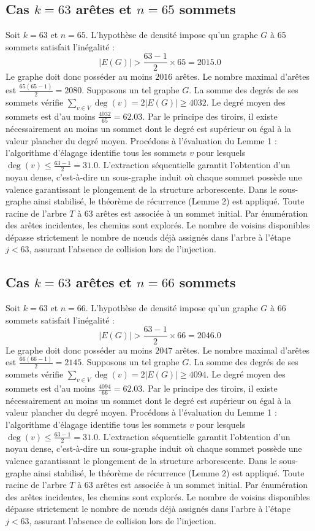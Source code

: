 \documentclass[12pt,a4paper]{article}
\begin{document}
\subsection{Cas $k = 63$ arêtes et $n = 65$ sommets}
Soit $k = 63$ et $n = 65$. L'hypothèse de densité impose qu'un graphe $G$ à 65 sommets satisfait l'inégalité :
$$ |E(G)| > \frac{63-1}{2} \times 65 = 2015.0 $$
Le graphe doit donc posséder au moins $2016$ arêtes. Le nombre maximal d'arêtes est $\frac{65(65-1)}{2} = 2080$.
Supposons un tel graphe $G$. La somme des degrés de ses sommets vérifie $\sum_{v \in V} \deg(v) = 2|E(G)| \geq 4032$.
Le degré moyen des sommets est d'au moins $\frac{4032}{65} = 62.03$.
Par le principe des tiroirs, il existe nécessairement au moins un sommet dont le degré est supérieur ou égal à la valeur plancher du degré moyen.
Procédons à l'évaluation du Lemme 1 : l'algorithme d'élagage identifie tous les sommets $v$ pour lesquels $\deg(v) \leq \frac{63-1}{2} = 31.0$.
L'extraction séquentielle garantit l'obtention d'un noyau dense, c'est-à-dire un sous-graphe induit où chaque sommet possède une valence garantissant le plongement de la structure arborescente.
Dans le sous-graphe ainsi stabilisé, le théorème de récurrence (Lemme 2) est appliqué. Toute racine de l'arbre $T$ à 63 arêtes est associée à un sommet initial. Par énumération des arêtes incidentes, les chemins sont explorés. Le nombre de voisins disponibles dépasse strictement le nombre de nœuds déjà assignés dans l'arbre à l'étape $j < 63$, assurant l'absence de collision lors de l'injection.

\subsection{Cas $k = 63$ arêtes et $n = 66$ sommets}
Soit $k = 63$ et $n = 66$. L'hypothèse de densité impose qu'un graphe $G$ à 66 sommets satisfait l'inégalité :
$$ |E(G)| > \frac{63-1}{2} \times 66 = 2046.0 $$
Le graphe doit donc posséder au moins $2047$ arêtes. Le nombre maximal d'arêtes est $\frac{66(66-1)}{2} = 2145$.
Supposons un tel graphe $G$. La somme des degrés de ses sommets vérifie $\sum_{v \in V} \deg(v) = 2|E(G)| \geq 4094$.
Le degré moyen des sommets est d'au moins $\frac{4094}{66} = 62.03$.
Par le principe des tiroirs, il existe nécessairement au moins un sommet dont le degré est supérieur ou égal à la valeur plancher du degré moyen.
Procédons à l'évaluation du Lemme 1 : l'algorithme d'élagage identifie tous les sommets $v$ pour lesquels $\deg(v) \leq \frac{63-1}{2} = 31.0$.
L'extraction séquentielle garantit l'obtention d'un noyau dense, c'est-à-dire un sous-graphe induit où chaque sommet possède une valence garantissant le plongement de la structure arborescente.
Dans le sous-graphe ainsi stabilisé, le théorème de récurrence (Lemme 2) est appliqué. Toute racine de l'arbre $T$ à 63 arêtes est associée à un sommet initial. Par énumération des arêtes incidentes, les chemins sont explorés. Le nombre de voisins disponibles dépasse strictement le nombre de nœuds déjà assignés dans l'arbre à l'étape $j < 63$, assurant l'absence de collision lors de l'injection.
\end{document}
